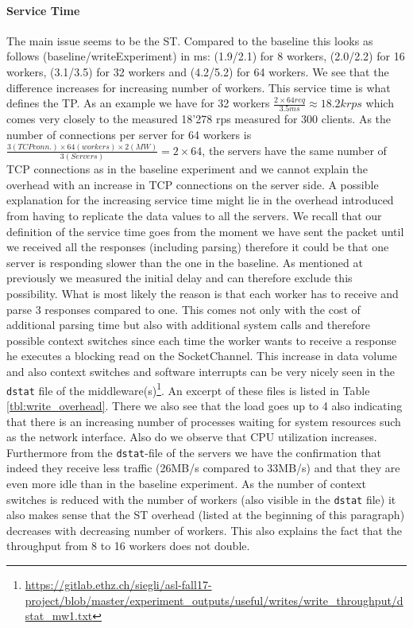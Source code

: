 \documentclass[11pt,a4paper]{article}
\let\tt\texttt
\begin{document}
\paragraph{Service Time} The main issue seems to be the ST. Compared to the baseline this looks as follows (baseline/writeExperiment) in ms: (1.9/2.1) for 8 workers, (2.0/2.2) for 16 workers, (3.1/3.5) for 32 workers and (4.2/5.2) for 64 workers. We see that the difference increases for increasing number of workers. This service time is what defines the TP. As an example we have for 32 workers $\frac{2\times64req}{3.5ms}\approx18.2k rps$ which comes very closely to the measured 18'278 rps measured for 300 clients. As the number of connections per server for 64 workers is $\frac{3 (TCP conn.) \times 64 (workers) \times 2 (MW)}{3 (Servers)} = 2 \times 64$, the servers have the same number of TCP connections as in the baseline experiment and we cannot explain the overhead with an increase in TCP connections on the server side. A possible explanation for the increasing service time might lie in the overhead introduced from having to replicate the data values to all the servers. We recall that our definition of the service time goes from the moment we have sent the packet until we received all the responses (including parsing) therefore it could be that one server is responding slower than the one in the baseline. As mentioned at previously we measured the initial delay and can therefore exclude this possibility.  What is most likely the reason is that each worker has to receive and parse 3 responses compared to one. This comes not only with the cost of additional parsing time but also with additional system calls and therefore possible context switches since each time the worker wants to receive a response he executes a blocking read on the SocketChannel. This increase in data volume and also context switches and software interrupts can be very nicely seen in the \tt{dstat} file of the middleware(s)\footnote{\url{https://gitlab.ethz.ch/siegli/asl-fall17-project/blob/master/experiment_outputs/useful/writes/write_throughput/dstat_mw1.txt}}. An excerpt of these files is listed in Table \ref{tbl:write_overhead}. There we also see that the load goes up to 4 also indicating that there is an increasing number of processes waiting for system resources such as the network interface. Also do we observe that CPU utilization increases. Furthermore from the \tt{dstat}-file of the servers we have the confirmation that indeed they receive less traffic (26MB/s compared to 33MB/s) and that they are even more idle than in the baseline experiment. As the number of context switches is reduced with the number of workers (also visible in the \tt{dstat} file) it also makes sense that the ST overhead (listed at the beginning of this paragraph) decreases with decreasing number of workers. This also explains the fact that the throughput from 8 to 16 workers does not double.
\end{document}
